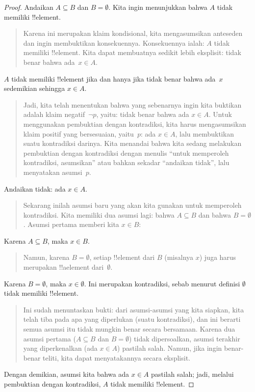 \documentclass[../../../include/open-logic-section]{subfiles}
\begin{document}
\begin{proof}
  Andaikan $A \subseteq B$ dan $B = \emptyset$. Kita ingin menunjukkan
  bahwa $A$ tidak memiliki !!{element}.
  \begin{quote}
    Karena ini merupakan klaim kondisional, kita mengasumsikan
    anteseden dan ingin membuktikan konsekuennya. Konsekuennya ialah:
    $A$ tidak memiliki !!{element}. Kita dapat membuatnya sedikit
    lebih eksplisit: tidak benar bahwa ada~$x \in A$.
  \end{quote}
  $A$ tidak memiliki !!{element} jika dan hanya jika tidak benar bahwa
  ada~$x$ sedemikian sehingga $x \in A$.
  \begin{quote}
    Jadi, kita telah menentukan bahwa yang sebenarnya ingin kita
    buktikan adalah klaim negatif~$\lnot p$, yaitu: tidak benar bahwa
    ada $x \in A$. Untuk menggunakan pembuktian dengan kontradiksi,
    kita harus mengasumsikan klaim positif yang bersesuaian, yaitu~$p$:
    ada $x \in A$, lalu membuktikan suatu kontradiksi darinya. Kita
    menandai bahwa kita sedang melakukan pembuktian dengan kontradiksi
    dengan menulis ``untuk memperoleh kontradiksi, asumsikan'' atau
    bahkan sekadar ``andaikan tidak'', lalu menyatakan asumsi~$p$.
  \end{quote}
  Andaikan tidak: ada $x \in A$.
  \begin{quote}
    Sekarang inilah asumsi baru yang akan kita gunakan untuk memperoleh
    kontradiksi. Kita memiliki dua asumsi lagi: bahwa $A \subseteq B$
    dan bahwa $B = \emptyset$. Asumsi pertama memberi kita $x \in B$:
  \end{quote}
  Karena $A \subseteq B$, maka $x \in B$.
  \begin{quote}
    Namun, karena $B = \emptyset$, setiap !!{element} dari $B$
    (misalnya $x$) juga harus merupakan !!a{element} dari~$\emptyset$.
  \end{quote}
  Karena $B = \emptyset$, maka $x \in \emptyset$. Ini merupakan
  kontradiksi, sebab menurut definisi $\emptyset$ tidak memiliki
  !!{element}.
  \begin{quote}
    Ini sudah menuntaskan bukti: dari asumsi-asumsi yang kita siapkan,
    kita telah tiba pada apa yang diperlukan (suatu kontradiksi), dan
    ini berarti semua asumsi itu tidak mungkin benar secara bersamaan.
    Karena dua asumsi pertama ($A \subseteq B$ dan $B = \emptyset$)
    tidak dipersoalkan, asumsi terakhir yang diperkenalkan (ada $x \in
    A$) pastilah salah. Namun, jika ingin benar-benar teliti, kita
    dapat menyatakannya secara eksplisit.
  \end{quote}
  Dengan demikian, asumsi kita bahwa ada $x \in A$ pastilah salah;
  jadi, melalui pembuktian dengan kontradiksi, $A$ tidak memiliki
  !!{element}.
\end{proof}
\end{document}
